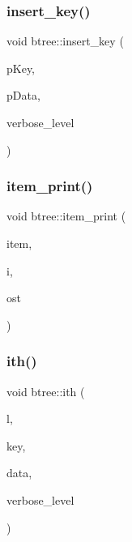 \mbox{\label{classbtree_a379d05419c9f1b786355bb141b278658}} 
\subsubsection{\texorpdfstring{insert\+\_\+key()}{insert\_key()}}
{\footnotesize\ttfamily void btree\+::insert\+\_\+key (\begin{DoxyParamCaption}\item[{\mbox{\hyperlink{discreta_8h_a535c8df88e5939fd8a1a3d083e75124a}{K\+E\+Y\+T\+Y\+PE}} $\ast$}]{p\+Key,  }\item[{\mbox{\hyperlink{discreta_8h_abf512b6b30146dda9c59049478bf3e99}{D\+A\+T\+A\+T\+Y\+PE}} $\ast$}]{p\+Data,  }\item[{\mbox{\hyperlink{galois_8h_a09fddde158a3a20bd2dcadb609de11dc}{I\+NT}}}]{verbose\+\_\+level }\end{DoxyParamCaption})}

\mbox{\label{classbtree_aca05a17e852f911cf7b1a971e7e7ad08}} 
\subsubsection{\texorpdfstring{item\+\_\+print()}{item\_print()}}
{\footnotesize\ttfamily void btree\+::item\+\_\+print (\begin{DoxyParamCaption}\item[{\mbox{\hyperlink{discreta_8h_a2fdd526928017b3784ac2ea203f31011}{Item\+Typ}} $\ast$}]{item,  }\item[{\mbox{\hyperlink{galois_8h_a09fddde158a3a20bd2dcadb609de11dc}{I\+NT}}}]{i,  }\item[{ostream \&}]{ost }\end{DoxyParamCaption})}

\mbox{\label{classbtree_aba50733eb0d292c2fd103cd6721cc1d6}} 
\subsubsection{\texorpdfstring{ith()}{ith()}}
{\footnotesize\ttfamily void btree\+::ith (\begin{DoxyParamCaption}\item[{\mbox{\hyperlink{galois_8h_a09fddde158a3a20bd2dcadb609de11dc}{I\+NT}}}]{l,  }\item[{\mbox{\hyperlink{discreta_8h_a535c8df88e5939fd8a1a3d083e75124a}{K\+E\+Y\+T\+Y\+PE}} $\ast$}]{key,  }\item[{\mbox{\hyperlink{discreta_8h_abf512b6b30146dda9c59049478bf3e99}{D\+A\+T\+A\+T\+Y\+PE}} $\ast$}]{data,  }\item[{\mbox{\hyperlink{galois_8h_a09fddde158a3a20bd2dcadb609de11dc}{I\+NT}}}]{verbose\+\_\+level }\end{DoxyParamCaption})}

